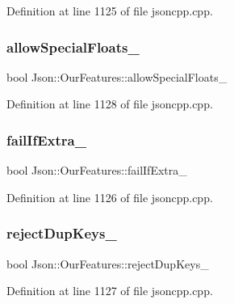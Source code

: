 Definition at line 1125 of file jsoncpp.\+cpp.

\hypertarget{class_json_1_1_our_features_af760f91cc2a7af37e44f78fb466061bb}{}\label{class_json_1_1_our_features_af760f91cc2a7af37e44f78fb466061bb} 
\subsubsection{\texorpdfstring{allow\+Special\+Floats\+\_\+}{allowSpecialFloats\_}}
{\footnotesize\ttfamily bool Json\+::\+Our\+Features\+::allow\+Special\+Floats\+\_\+}



Definition at line 1128 of file jsoncpp.\+cpp.

\hypertarget{class_json_1_1_our_features_ae8ad25b90706c78f1a8fe929191ac61b}{}\label{class_json_1_1_our_features_ae8ad25b90706c78f1a8fe929191ac61b} 
\subsubsection{\texorpdfstring{fail\+If\+Extra\+\_\+}{failIfExtra\_}}
{\footnotesize\ttfamily bool Json\+::\+Our\+Features\+::fail\+If\+Extra\+\_\+}



Definition at line 1126 of file jsoncpp.\+cpp.

\hypertarget{class_json_1_1_our_features_a39b8e0b86b1c24a45e800c023bb715aa}{}\label{class_json_1_1_our_features_a39b8e0b86b1c24a45e800c023bb715aa} 
\subsubsection{\texorpdfstring{reject\+Dup\+Keys\+\_\+}{rejectDupKeys\_}}
{\footnotesize\ttfamily bool Json\+::\+Our\+Features\+::reject\+Dup\+Keys\+\_\+}



Definition at line 1127 of file jsoncpp.\+cpp.

